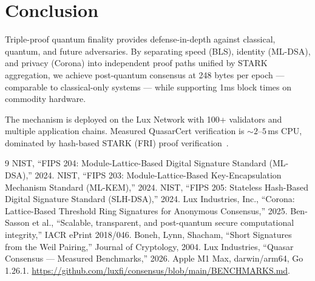 \section{Conclusion}


Triple-proof quantum finality provides defense-in-depth against classical, quantum, and future adversaries. By separating speed (BLS), identity (ML-DSA), and privacy (Corona) into independent proof paths unified by STARK aggregation, we achieve post-quantum consensus at 248 bytes per epoch --- comparable to classical-only systems --- while supporting 1ms block times on commodity hardware.

The mechanism is deployed on the Lux Network with 100+ validators and multiple application chains. Measured QuasarCert verification is ${\sim}2$--$5$\,ms CPU, dominated by hash-based STARK (FRI) proof verification~\cite{lux-benchmarks}.

\begin{thebibliography}{9}
 NIST, ``FIPS 204: Module-Lattice-Based Digital Signature Standard (ML-DSA),'' 2024.
 NIST, ``FIPS 203: Module-Lattice-Based Key-Encapsulation Mechanism Standard (ML-KEM),'' 2024.
 NIST, ``FIPS 205: Stateless Hash-Based Digital Signature Standard (SLH-DSA),'' 2024.
 Lux Industries, Inc., ``Corona: Lattice-Based Threshold Ring Signatures for Anonymous Consensus,'' 2025.
 Ben-Sasson et al., ``Scalable, transparent, and post-quantum secure computational integrity,'' IACR ePrint 2018/046.
 Boneh, Lynn, Shacham, ``Short Signatures from the Weil Pairing,'' Journal of Cryptology, 2004.
 Lux Industries, ``Quasar Consensus --- Measured Benchmarks,'' 2026. Apple M1 Max, darwin/arm64, Go 1.26.1. \url{https://github.com/luxfi/consensus/blob/main/BENCHMARKS.md}.
\end{thebibliography}

